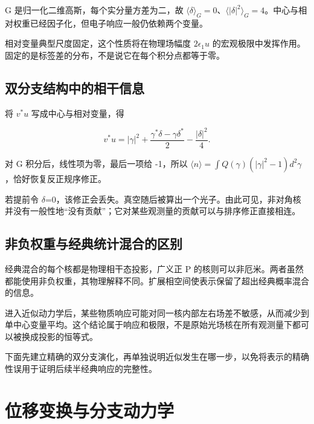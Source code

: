 \documentclass[UTF8,a4paper,zihao=-4,openany,fontset=fandol]{ctexbook}
\begin{document}
G 是归一化二维高斯，每个实分量方差为二，故 $\langle\delta\rangle_G=0$、$\langle|\delta|^2\rangle_G=4$。中心与相对权重已经因子化，但电子响应一般仍依赖两个变量。



相对变量典型尺度固定，这个性质将在物理场幅度 $2\epsilon_1u$ 的宏观极限中发挥作用。固定的是标签差的分布，不是说它在每个积分点都等于零。



\section{双分支结构中的相干信息}\label{sec:10:8}


将 $v^*u$ 写成中心与相对变量，得



\begin{equation*}
v^*u=|\gamma|^2+
\frac{\gamma^*\delta-\gamma\delta^*}{2}
-\frac{|\delta|^2}{4}.
\tag{10.6}\label{eq:10.6}
\end{equation*}


对 G 积分后，线性项为零，最后一项给 -1，所以 $\langle n\rangle=\int Q(\gamma)(|\gamma|^2-1)d^2\gamma$，恰好恢复反正规序修正。



若提前令 $\delta$=0，该修正会丢失。真空随后被算出一个光子。由此可见，非对角核并没有一般性地“没有贡献”；它对某些观测量的贡献可以与排序修正直接相连。



\section{非负权重与经典统计混合的区别}\label{sec:10:9}


经典混合的每个核都是物理相干态投影，广义正 P 的核则可以非厄米。两者虽然都能使用非负权重，其物理解释不同。扩展相空间使表示保留了超出经典概率混合的信息。



进入近似动力学后，某些物质响应可能对同一核内部左右场差不敏感，从而减少到单中心变量平均。这个结论属于响应和极限，不是原始光场核在所有观测量下都可以被换成投影的恒等式。



下面先建立精确的双分支演化，再单独说明近似发生在哪一步，以免将表示的精确性误用于证明后续半经典响应的完整性。



\chapter{位移变换与分支动力学}\label{ch:11}
\end{document}
